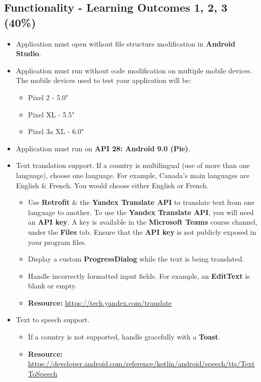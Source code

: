 \documentclass{article}
\begin{document}
\subsection*{Functionality - Learning Outcomes 1, 2, 3 (40\%)}
\begin{itemize}
	\item Application must open without file structure modification in \textbf{Android Studio}.
	\item Application must run without code modification on multiple mobile devices. The mobile devices used to test your application will be:
	      \begin{itemize}
		      \item Pixel 2 - 5.0"
		      \item Pixel XL - 5.5"
		      \item Pixel 3a XL - 6.0"
	      \end{itemize}
	\item Application must run on \textbf{API 28: Android 9.0 (Pie)}.
	\item Text translation support. If a country is multilingual (use of more than one language), choose one language. For example, Canada's main languages are English \& French. You would choose either English or French.
	      \begin{itemize}
		      \item Use \textbf{Retrofit} \& the \textbf{Yandex Translate API} to translate text from one language to another. To use the \textbf{Yandex Translate API}, you will need an \textbf{API key}. A key is available in the \textbf{Microsoft Teams} course channel, under the \textbf{Files} tab. Ensure that the \textbf{API key} is not publicly exposed in your program files.
		      \item Display a custom \textbf{ProgressDialog} while the text is being translated.
		      \item Handle incorrectly formatted input fields. For example, an \textbf{EditText} is blank or empty.
		      \item \textbf{Resource:} \footnotesize\href{https://tech.yandex.com/translate}{https://tech.yandex.com/translate}
	      \end{itemize}
	\item Text to speech support.
	      \begin{itemize}
		      \item If a country is not supported, handle gracefully with a \textbf{Toast}.
		      \item \textbf{Resource:} \footnotesize\href{https://developer.android.com/reference/kotlin/android/speech/tts/TextToSpeech}{https://developer.android.com/reference/kotlin/android/speech/tts/TextToSpeech}

\end{itemize}
\end{itemize}
\end{document}
